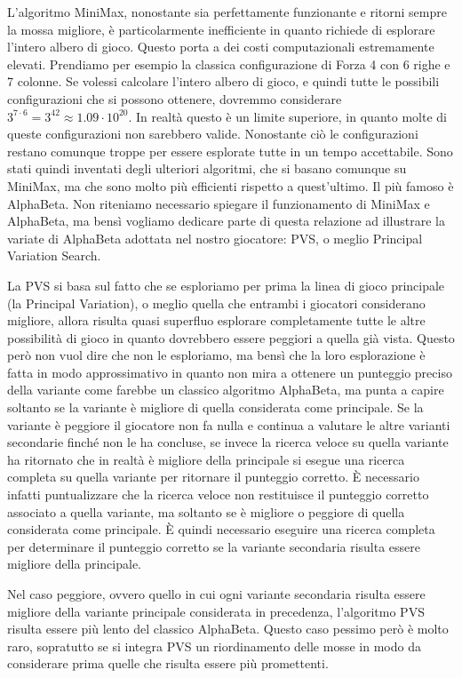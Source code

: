 \documentclass[a4paper]{article}
\begin{document}
L'algoritmo MiniMax, nonostante sia perfettamente funzionante e ritorni sempre
la mossa migliore, è particolarmente inefficiente in quanto richiede di 
esplorare l'intero albero di gioco. Questo porta a dei costi computazionali 
estremamente elevati. Prendiamo per esempio la classica configurazione di Forza 
4 con 6 righe e 7 colonne. Se volessi calcolare l'intero albero di gioco, e 
quindi tutte le possibili configurazioni che si possono ottenere, dovremmo 
considerare $3^{7 \cdot 6} = 3^{42} \approx 1.09 \cdot 10^{20}$. In realtà 
questo è un limite superiore, in quanto molte di queste configurazioni non 
sarebbero valide. Nonostante ciò le configurazioni restano comunque troppe per
essere esplorate tutte in un tempo accettabile. Sono stati quindi inventati 
degli ulteriori algoritmi, che si basano comunque su MiniMax, ma che sono molto 
più efficienti rispetto a quest'ultimo. Il più famoso è AlphaBeta. Non 
riteniamo necessario spiegare il funzionamento di MiniMax e AlphaBeta, ma bensì 
vogliamo dedicare parte di questa relazione ad illustrare la variate di 
AlphaBeta adottata nel nostro giocatore: PVS, o meglio Principal Variation 
Search.

La PVS si basa sul fatto che se esploriamo per prima la linea di gioco 
principale (la Principal Variation), o meglio quella che entrambi i giocatori 
considerano migliore, allora risulta quasi superfluo esplorare completamente 
tutte le altre possibilità di gioco in quanto dovrebbero essere peggiori a 
quella già vista. Questo però non vuol dire che non le esploriamo, ma bensì che 
la loro esplorazione è fatta in modo approssimativo in quanto non mira a 
ottenere un punteggio preciso della variante come farebbe un classico algoritmo 
AlphaBeta, ma punta a capire soltanto se la variante è migliore di quella 
considerata come principale. Se la variante è peggiore il giocatore non fa nulla 
e continua a valutare le altre varianti secondarie finché non le ha concluse, se 
invece la ricerca veloce su quella variante ha ritornato che in realtà è 
migliore della principale si esegue una ricerca completa su quella variante per 
ritornare il punteggio corretto. È necessario infatti puntualizzare che la 
ricerca veloce non restituisce il punteggio corretto associato a quella 
variante, ma soltanto se è migliore o peggiore di quella considerata come 
principale. È quindi necessario eseguire una ricerca completa per determinare il
punteggio corretto se la variante secondaria risulta essere migliore della 
principale.

Nel caso peggiore, ovvero quello in cui ogni variante secondaria risulta essere
migliore della variante principale considerata in precedenza, l'algoritmo PVS 
risulta essere più lento del classico AlphaBeta. Questo caso pessimo però è 
molto raro, sopratutto se si integra PVS un riordinamento delle mosse in modo
da considerare prima quelle che risulta essere più promettenti.
\end{document}
